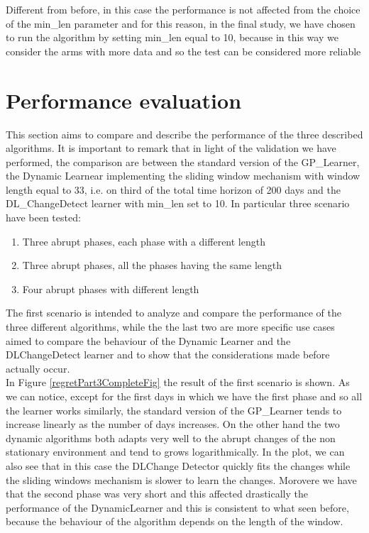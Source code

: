 Different from before, in this case the performance is not affected from the choice of the min\_len parameter and for this reason, in the final study, we have chosen to run the algorithm by setting min\_len equal to 10, because in this way we consider the arms with more data and so the test can be considered more reliable


\section{Performance evaluation}

This section aims to compare and describe the performance of the three described algorithms.
It is important to remark that in light of the validation we have performed, the comparison are between the standard version of the GP\_Learner, the Dynamic Learnear implementing the sliding window mechanism with window length equal to 33, i.e. on third of the total time horizon of 200 days and the DL\_ChangeDetect learner with min\_len set to 10.
In particular three scenario have been tested:

\begin{enumerate}
\item Three abrupt phases, each phase with a different length
\item Three abrupt phases, all the phases having the same length
\item Four abrupt phases with different length
\end{enumerate}

The first scenario is intended to analyze and compare the performance of the three different algorithms, while the the last two are more specific use cases aimed to compare the behaviour of the Dynamic Learner and the DLChangeDetect learner and to show that the considerations made before actually occur.\\
In Figure \ref{regretPart3CompleteFig} the result of the first scenario is shown. As we can notice, except for the first days in which we have the first phase and so all the learner works similarly, the standard version of the GP\_Learner tends to increase linearly as the number of days increases. On the other hand the two dynamic algorithms both adapts very well to the abrupt changes of the non stationary environment and tend to grows logarithmically. In the plot, we can also see that in this case the DLChange Detector quickly fits the changes while the sliding windows mechanism is slower to learn the changes. Morovere we have that the second phase was very short and this affected drastically the performance of the DynamicLearner and this is consistent to what seen before, because the behaviour of the algorithm depends on the length of the window. 

